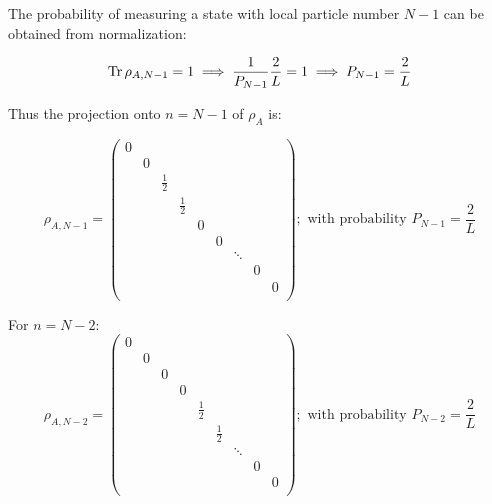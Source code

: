 The probability of measuring a state with local particle number $N-1$ can be obtained from normalization:

\begin{equation}
\operatorname{Tr}{\rho_{A,N-1}} = 1 \implies \frac{1}{P_{N-1}}\frac{2}{L} = 1 \implies P_{N-1} = \frac{2}{L}
\end{equation}

Thus the projection onto $n=N-1$ of $\rho_{A}$ is:

\begin{equation}
\rho_{A,N-1} = \begin{pmatrix} 
0 \\
& 0 \\
& & \frac{1}{2} \\
& & & \frac{1}{2} \\
& & & &  0 \\
& & & & & 0 \\
& & & & &  & \ddots \\
& & & & & & &  0 \\
& & & & & & & &  0 \\
\end{pmatrix} ; \text{ with probability } P_{N-1} = \frac{2}{L}
\end{equation}

For $n = N-2$:
\begin{equation}
 \rho_{A,N-2} = \begin{pmatrix} 
0 \\
& 0 \\
& & 0  \\
& & & 0 \\
& & & &  \frac{1}{2} \\
& & & & & \frac{1}{2} \\
& & & & &  & \ddots \\
& & & & & & &  0 \\
& & & & & & & &  0 \\
\end{pmatrix} ; \text{ with probability } P_{N-2} = \frac{2}{L}
\end{equation}

